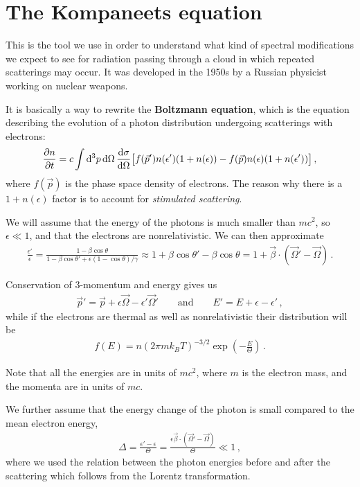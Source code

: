 \documentclass[main.tex]{subfiles}
\begin{document}
\section{The Kompaneets equation}

This is the tool we use in order to understand what kind of spectral modifications we expect to see for radiation passing through a cloud in which repeated scatterings may occur. 
It was developed in the 1950s by a Russian physicist working on nuclear weapons. 

It is basically a way to rewrite the \textbf{Boltzmann equation}, which is the equation describing the evolution of a photon distribution undergoing scatterings with electrons: 
%
\begin{align}
\pdv{n}{t} = c \int \dd[3]{p} \dd{\Omega } \dv{\sigma }{\Omega } 
\qty[f(\vec{p}') n(\epsilon ') (1 + n(\epsilon )) - f(\vec{p}) n(\epsilon ) (1 + n(\epsilon '))]
\,,
\end{align}
%
where \(f(\vec{p})\) is the phase space density of electrons. 
The reason why there is a \(1 + n(\epsilon )\) factor is to account for \emph{stimulated scattering}.

We will assume that the energy of the photons is much smaller than \(mc^2\), so \(\epsilon \ll 1\), and that the electrons are nonrelativistic. We can then approximate 
%
\begin{align}
\frac{\epsilon'}{\epsilon } = \frac{1 - \beta \cos \theta }{1 - \beta \cos \theta ' + \epsilon (1 - \cos \theta ) / \gamma } \approx 1 + \beta \cos \theta ' - \beta \cos \theta = 1 + \vec{\beta} \cdot (\vec{\Omega}' - \vec{\Omega})
\,.
\end{align}

Conservation of 3-momentum and energy gives us 
%
\begin{align}
\vec{p}' = \vec{p} + \epsilon \vec{\Omega} - \epsilon ' \vec{\Omega}' 
\qquad \text{and} \qquad
E' = E + \epsilon - \epsilon '
\,,
\end{align}
%
while if the electrons are thermal as well as nonrelativistic their distribution will be 
%
\begin{align}
f(E) = n (2 \pi m k_B T)^{-3/2} \exp(- \frac{E}{\Theta }) 
\,.
\end{align}

Note that all the energies are in units of \(mc^2\), where \(m\) is the electron mass, and the momenta are in units of \(mc\). 

We further assume that the energy change of the photon is small compared to the mean electron energy, 
%
\begin{align}
\Delta = \frac{\epsilon ' - \epsilon }{\Theta } = \frac{\epsilon \vec{\beta} \cdot (\vec{\Omega}' - \vec{\Omega})}{\Theta } \ll 1 
\,,
\end{align}
%
where we used the relation between the photon energies before and after the scattering which follows from the Lorentz transformation. 
\end{document}
